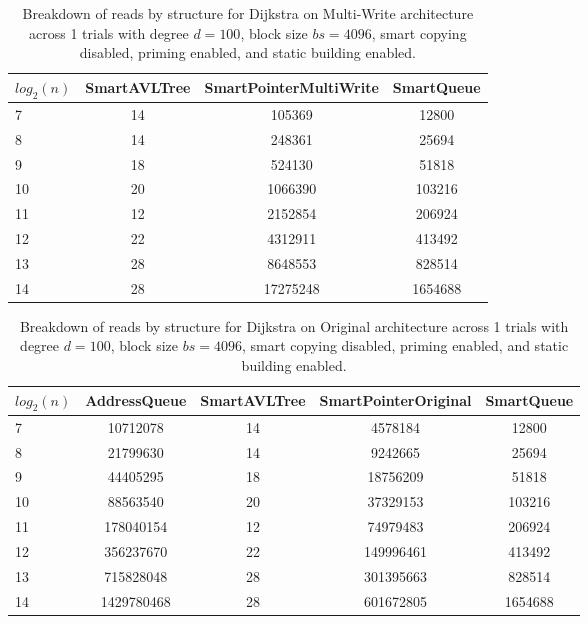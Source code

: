 \begin{table}[]
\centering
\begin{tabular}{|l|c|c|c|}
$log_2(n)$ & SmartAVLTree & SmartPointerMultiWrite & SmartQueue \\ \hline
7 & 14 & 105369 & 12800 \\ \hline
8 & 14 & 248361 & 25694 \\ \hline
9 & 18 & 524130 & 51818 \\ \hline
10 & 20 & 1066390 & 103216 \\ \hline
11 & 12 & 2152854 & 206924 \\ \hline
12 & 22 & 4312911 & 413492 \\ \hline
13 & 28 & 8648553 & 828514 \\ \hline
14 & 28 & 17275248 & 1654688 \\ \hline
\end{tabular}
\caption{Breakdown of reads by structure for Dijkstra on Multi-Write architecture across 1 trials with degree $d=100$, block size $bs=4096$, smart copying disabled, priming enabled, and static building enabled.}
    \label{tab:reads_by_structure_dijkstra_d100_bs4096_trials1_copiesfalse_primetrue_staticinsertiontrue_ptmultiwrite_movetrue}
\end{table}

\begin{table}[]
\centering
\begin{tabular}{|l|c|c|c|c|}
$log_2(n)$ & AddressQueue & SmartAVLTree & SmartPointerOriginal & SmartQueue \\ \hline
7 & 10712078 & 14 & 4578184 & 12800 \\ \hline
8 & 21799630 & 14 & 9242665 & 25694 \\ \hline
9 & 44405295 & 18 & 18756209 & 51818 \\ \hline
10 & 88563540 & 20 & 37329153 & 103216 \\ \hline
11 & 178040154 & 12 & 74979483 & 206924 \\ \hline
12 & 356237670 & 22 & 149996461 & 413492 \\ \hline
13 & 715828048 & 28 & 301395663 & 828514 \\ \hline
14 & 1429780468 & 28 & 601672805 & 1654688 \\ \hline
\end{tabular}
\caption{Breakdown of reads by structure for Dijkstra on Original architecture across 1 trials with degree $d=100$, block size $bs=4096$, smart copying disabled, priming enabled, and static building enabled.}
    \label{tab:reads_by_structure_dijkstra_d100_bs4096_trials1_copiesfalse_primetrue_staticinsertiontrue_ptoriginal_movefalse}
\end{table}

